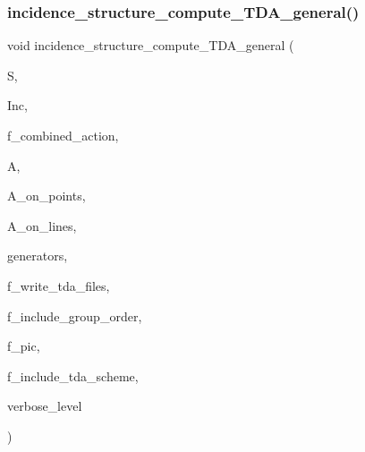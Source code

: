 \subsubsection{\texorpdfstring{incidence\+\_\+structure\+\_\+compute\+\_\+\+T\+D\+A\+\_\+general()}{incidence\_structure\_compute\_TDA\_general()}}
{\footnotesize\ttfamily void incidence\+\_\+structure\+\_\+compute\+\_\+\+T\+D\+A\+\_\+general (\begin{DoxyParamCaption}\item[{\mbox{\hyperlink{classpartitionstack}{partitionstack}} \&}]{S,  }\item[{\mbox{\hyperlink{classincidence__structure}{incidence\+\_\+structure}} $\ast$}]{Inc,  }\item[{\mbox{\hyperlink{galois_8h_a09fddde158a3a20bd2dcadb609de11dc}{I\+NT}}}]{f\+\_\+combined\+\_\+action,  }\item[{\mbox{\hyperlink{classaction}{action}} $\ast$}]{A,  }\item[{\mbox{\hyperlink{classaction}{action}} $\ast$}]{A\+\_\+on\+\_\+points,  }\item[{\mbox{\hyperlink{classaction}{action}} $\ast$}]{A\+\_\+on\+\_\+lines,  }\item[{\mbox{\hyperlink{classvector__ge}{vector\+\_\+ge}} $\ast$}]{generators,  }\item[{\mbox{\hyperlink{galois_8h_a09fddde158a3a20bd2dcadb609de11dc}{I\+NT}}}]{f\+\_\+write\+\_\+tda\+\_\+files,  }\item[{\mbox{\hyperlink{galois_8h_a09fddde158a3a20bd2dcadb609de11dc}{I\+NT}}}]{f\+\_\+include\+\_\+group\+\_\+order,  }\item[{\mbox{\hyperlink{galois_8h_a09fddde158a3a20bd2dcadb609de11dc}{I\+NT}}}]{f\+\_\+pic,  }\item[{\mbox{\hyperlink{galois_8h_a09fddde158a3a20bd2dcadb609de11dc}{I\+NT}}}]{f\+\_\+include\+\_\+tda\+\_\+scheme,  }\item[{\mbox{\hyperlink{galois_8h_a09fddde158a3a20bd2dcadb609de11dc}{I\+NT}}}]{verbose\+\_\+level }\end{DoxyParamCaption})}

\mbox{\label{_t_o_p___l_e_v_e_l_2incidence__structure_8_c_a63d0e7a207e173b92c0e560df4d8e980}} 

